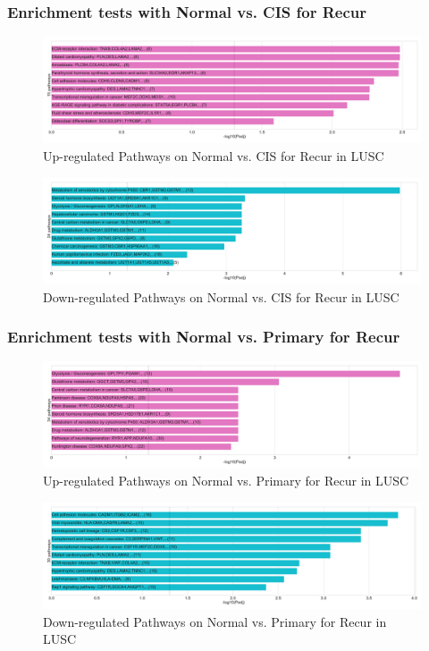 \documentclass{beamer}
\begin{document}
    \begin{frame}
        \frametitle{Enrichment tests with Normal vs. CIS for Recur}

        \begin{figure}
            \includegraphics[width=0.8 \linewidth]{figures/DEG/Enrichment/STAR.FPKM.SQC.Recur.Normal-CIS.Up.KEGG.pdf}
            \caption{Up-regulated Pathways on Normal vs. CIS for Recur in LUSC}
        \end{figure}

        \begin{figure}
            \includegraphics[width=0.8 \linewidth]{figures/DEG/Enrichment/STAR.FPKM.SQC.Recur.Normal-CIS.Down.KEGG.pdf}
            \caption{Down-regulated Pathways on Normal vs. CIS for Recur in LUSC}
        \end{figure}
    \end{frame}

    \begin{frame}
        \frametitle{Enrichment tests with Normal vs. Primary for Recur}

        \begin{figure}
            \includegraphics[width=0.8 \linewidth]{figures/DEG/Enrichment/STAR.FPKM.SQC.Recur.Normal-Primary.Up.KEGG.pdf}
            \caption{Up-regulated Pathways on Normal vs. Primary for Recur in LUSC}
        \end{figure}

        \begin{figure}
            \includegraphics[width=0.8 \linewidth]{figures/DEG/Enrichment/STAR.FPKM.SQC.Recur.Normal-Primary.Down.KEGG.pdf}
            \caption{Down-regulated Pathways on Normal vs. Primary for Recur in LUSC}
        \end{figure}
    \end{frame}
\end{document}

